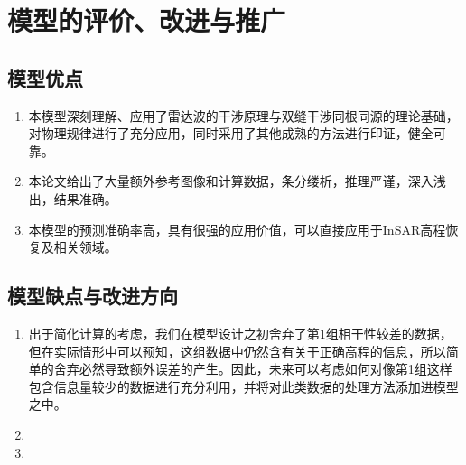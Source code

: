 \documentclass[a4paper]{article}
\begin{document}
	\section{模型的评价、改进与推广}
	\subsection{模型优点}
	\begin{enumerate}
		\item 本模型深刻理解、应用了雷达波的干涉原理与双缝干涉同根同源的理论基础，对物理规律进行了充分应用，同时采用了其他成熟的方法进行印证，健全可靠。
		\item 本论文给出了大量额外参考图像和计算数据，条分缕析，推理严谨，深入浅出，结果准确。
		\item 本模型的预测准确率高，具有很强的应用价值，可以直接应用于InSAR高程恢复及相关领域。
	\end{enumerate}
	
	\subsection{模型缺点与改进方向}
	\begin{enumerate}
		\item 出于简化计算的考虑，我们在模型设计之初舍弃了第1组相干性较差的数据，但在实际情形中可以预知，这组数据中仍然含有关于正确高程的信息，所以简单的舍弃必然导致额外误差的产生。因此，未来可以考虑如何对像第1组这样包含信息量较少的数据进行充分利用，并将对此类数据的处理方法添加进模型之中。
		\item 
		\item 
	\end{enumerate}
	
	\clearpage

\end{document}
